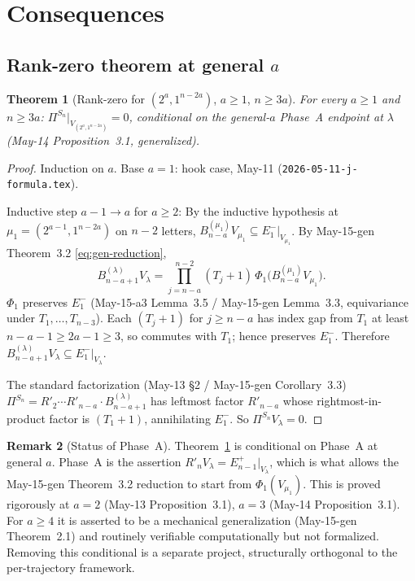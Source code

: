 \documentclass[11pt]{article}
\newtheorem{theorem}{Theorem}
\theoremstyle{definition}
\newtheorem{remark}[theorem]{Remark}
\begin{document}
\section{Consequences}\label{sec:consequences}

\subsection{Rank-zero theorem at general $a$}

\begin{theorem}[Rank-zero for $(2^a,1^{n-2a})$, $a\ge 1$,
$n\ge 3a$]\label{thm:rank-zero}
For every $a\ge 1$ and $n\ge 3a$:
$\Pi^{S_n}|_{V_{(2^a,1^{n-2a})}}=0$, conditional on the
general-$a$ Phase~A endpoint at $\lambda$
(May-14 Proposition~3.1, generalized).
\end{theorem}

\begin{proof}
Induction on $a$.  Base $a=1$: hook case, May-11
(\texttt{2026-05-11-j-formula.tex}).

Inductive step $a-1\to a$ for $a\ge 2$:  By the inductive
hypothesis at $\mu_1=(2^{a-1},1^{n-2a})$ on $n-2$ letters,
$B_{n-a}^{(\mu_1)}V_{\mu_1}\subseteq E_1^-|_{V_{\mu_1}}$.  By
May-15-gen Theorem~3.2 \eqref{eq:gen-reduction},
\[
   B_{n-a+1}^{(\lambda)}V_\lambda
   =\prod_{j=n-a}^{n-2}(T_j{+}1)\,\Phi_1\big(B_{n-a}^{(\mu_1)}V_{\mu_1}\big).
\]
$\Phi_1$ preserves $E_1^-$ (May-15-a3 Lemma~3.5 / May-15-gen
Lemma~3.3, equivariance under $T_1,\ldots,T_{n-3}$).
Each $(T_j{+}1)$ for $j\ge n-a$ has index gap from $T_1$ at least
$n-a-1\ge 2a-1\ge 3$, so commutes with $T_1$; hence preserves
$E_1^-$.  Therefore
$B_{n-a+1}^{(\lambda)}V_\lambda\subseteq E_1^-|_{V_\lambda}$.

The standard factorization (May-13 \S2 / May-15-gen Corollary~3.3)
$\Pi^{S_n}=R'_2\cdots R'_{n-a}\cdot B_{n-a+1}^{(\lambda)}$ has
leftmost factor $R'_{n-a}$ whose rightmost-in-product factor is
$(T_1{+}1)$, annihilating $E_1^-$.  So
$\Pi^{S_n}V_\lambda=0$.
\end{proof}

\begin{remark}[Status of Phase~A]
Theorem~\ref{thm:rank-zero} is conditional on Phase~A at general $a$.
Phase~A is the assertion $R'_nV_\lambda=E_{n-1}^+|_{V_\lambda}$,
which is what allows the May-15-gen Theorem~3.2 reduction
to start from $\Phi_1(V_{\mu_1})$.  This is proved rigorously at
$a=2$ (May-13 Proposition~3.1), $a=3$ (May-14 Proposition~3.1).
For $a\ge 4$ it is asserted to be a mechanical generalization
(May-15-gen Theorem~2.1) and routinely verifiable computationally
but not formalized.  Removing this conditional is a separate
project, structurally orthogonal to the per-trajectory framework.
\end{remark}
\end{document}
